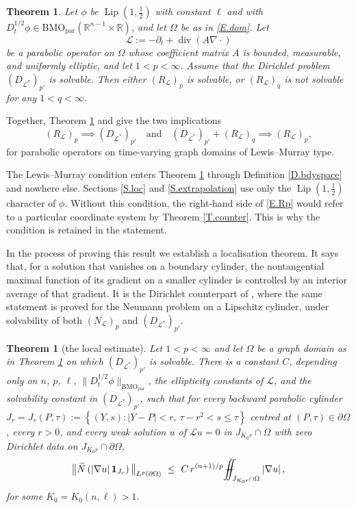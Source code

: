 \documentclass[10pt,a4paper]{amsart}
\numberwithin{equation}{section}
\DeclareMathOperator{\Lip}{Lip}
\DeclareMathOperator{\divg}{div}
\newcommand{\R}{\mathbb R}
\newcommand{\abs}[1]{\left\vert#1\right\vert}
\newcommand{\br}[1]{\left(#1\right)}
\newcommand{\set}[1]{\left\{#1\right\}}
\newcommand{\om}{\Omega}
\newcommand{\pom}{\partial\Omega}
\newcommand{\pd}{\partial}
\newcommand{\dhalf}{D_t^{1/2}}
\newcommand{\BMOpar}{\mathrm{BMO}_{\mathrm{par}}}
\newcommand{\LL}{\mathcal L}
\newcommand{\Nt}{\widetilde N}
\def\Yint#1{\mathchoice
	{\YYint\displaystyle\textstyle{#1}}%
	{\YYint\textstyle\scriptstyle{#1}}%
	{\YYint\scriptstyle\scriptscriptstyle{#1}}%
	{\YYint\scriptscriptstyle\scriptscriptstyle{#1}}%
	\!\dint}
\newcommand{\dint}{\int\!\!\!\!\!\int}
\def\YYint#1#2#3{{\setbox0=\hbox{$#1{#2#3}{\iint}$}
		\vcenter{\hbox{$#2#3$}}\kern-.51\wd0}}
\def\longdash{\mkern-1.5mu{-}\mkern-7.5mu{-}}
\def\fiint{\Yint\longdash}
\newtheorem{theorem}[equation]{Theorem}
\begin{document}
\begin{theorem}\label{T.dual}
Let $\phi$ be $\Lip(1,\tfrac12)$ with constant $\ell$ and with
$\dhalf\phi\in\BMOpar(\R^{n-1}\times\R)$, and let $\om$ be as in
\eqref{E.dom}. Let
$$\LL:=-\pd_t+\divg\br{A\nabla\cdot}$$
be a parabolic operator on $\om$ whose coefficient matrix $A$ is bounded,
measurable, and uniformly elliptic, and let $1<p<\infty$. Assume that the
Dirichlet problem $(D_{\LL^*})_{p'}$ is solvable. Then either $(R_{\LL})_p$ is
solvable, or $(R_{\LL})_q$ is not solvable for any $1<q<\infty$.
\end{theorem}

Together, Theorem \ref{T.dual} and \cite{DD} give the two implications
\[ (R_{\LL})_p \implies (D_{\LL^*})_{p'} \quad\mbox{and}\quad
   (D_{\LL^*})_{p'} + (R_{\LL})_q \implies (R_{\LL})_p, \]
for parabolic operators on time-varying graph domains of Lewis--Murray type.\medskip

\noindent The Lewis--Murray condition enters Theorem \ref{T.dual} through
Definition \ref{D.bdyspace} and nowhere else. Sections \ref{S.loc} and
\ref{S.extrapolation} use only the $\Lip(1,\tfrac12)$ character of $\phi$.
Without this condition, the right-hand side of \eqref{E.Rp} would refer to a
particular coordinate system by Theorem \ref{T.counter}. This is why the
condition is retained in the statement.\medskip

In the process of proving this result we establish a localisation theorem. It
says that, for a solution that vanishes on a boundary cylinder, the
nontangential maximal function of its gradient on a smaller cylinder is
controlled by an interior average of that gradient. It is the Dirichlet
counterpart of
\cite[Theorem 1.2]{DLP2}, where the same statement is proved for the Neumann
problem on a Lipschitz cylinder, under solvability of both $(N_\LL)_p$ and
$(D_{\LL^*})_{p'}$.

\begin{theorem}[the local estimate]\label{T.locest}
Let $1<p<\infty$ and let $\om$ be a graph domain as in Theorem \ref{T.dual}
on which $(D_{\LL^*})_{p'}$ is solvable. There is a constant $C$, depending
only on $n$, $p$, $\ell$, $\|\dhalf\phi\|_{\BMOpar}$, the ellipticity constants
of $\LL$, and the solvability constant in $(D_{\LL^*})_{p'}$, such that for
every backward parabolic cylinder
$J_r=J_r(P,\tau):=\set{(Y,s):|Y-P|<r,\ \tau-r^2<s\le\tau}$
centred at $(P,\tau)\in\pom$, every $r>0$, and every weak solution $u$ of
$\LL u=0$ in $J_{K_0r}\cap\om$ with zero Dirichlet data on $J_{K_0r}\cap\pom$,
\begin{equation}\label{E.locest}
  \big\|\Nt\br{\abs{\nabla u}\mathbf 1_{J_r}}\big\|_{L^p(\pom)}
  \ \le\ C\,r^{(n+1)/p}\,\fiint_{J_{K_0r}\cap\om}\abs{\nabla u} ,
\end{equation}
for some $K_0=K_0(n,\ell)>1$.
\end{theorem}
\end{document}
